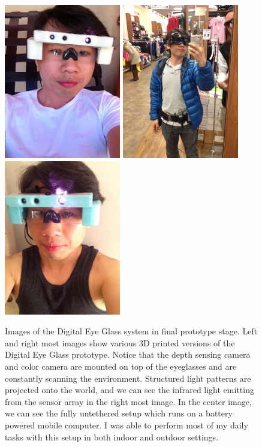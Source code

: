 \begin{figure}
\center
\includegraphics[width=2in]{ch7/figures/left_white.jpg}
\includegraphics[width=2in]{ch7/figures/wearable.jpg}
\includegraphics[width=2in]{ch7/figures/right_blue.jpg}

 \caption{Images of the Digital Eye Glass system in final prototype stage. Left and right most images show various 3D printed versions of the Digital Eye Glass prototype. Notice that the depth sensing camera and color camera are mounted on top of the eyeglasses and are constantly scanning the environment. Structured light patterns are projected onto the world, and we can see the infrared light emitting from the sensor array in the right most image. In the center image, we can see the fully untethered setup which runs on a battery powered mobile computer. I was able to perform most of my daily tasks with this setup in both indoor and outdoor settings.}
 \label{fig:prototypes}
\end{figure}



